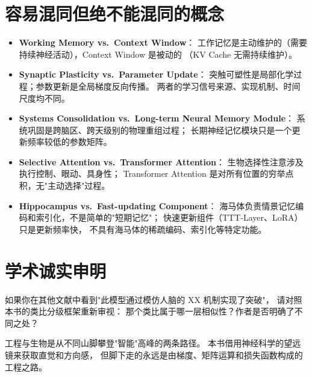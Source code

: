 \section{容易混同但绝不能混同的概念}

\begin{itemize}
  \item \textbf{Working Memory vs.\ Context Window}：
    工作记忆是主动维护的（需要持续神经活动），Context Window 是被动的
    （KV Cache 无需持续维护）。

  \item \textbf{Synaptic Plasticity vs.\ Parameter Update}：
    突触可塑性是局部化学过程；参数更新是全局梯度反向传播。
    两者的学习信号来源、实现机制、时间尺度均不同。

  \item \textbf{Systems Consolidation vs.\ Long-term Neural Memory Module}：
    系统巩固是跨脑区、跨天级别的物理重组过程；
    长期神经记忆模块只是一个更新频率较低的参数矩阵。

  \item \textbf{Selective Attention vs.\ Transformer Attention}：
    生物选择性注意涉及执行控制、眼动、具身性；
    Transformer Attention 是对所有位置的穷举点积，无"主动选择"过程。

  \item \textbf{Hippocampus vs.\ Fast-updating Component}：
    海马体负责情景记忆编码和索引化，不是简单的"短期记忆"；
    快速更新组件（TTT-Layer、LoRA）只是更新频率快，
    不具有海马体的稀疏编码、索引化等特定功能。
\end{itemize}

\section{学术诚实申明}

如果你在其他文献中看到"此模型通过模仿人脑的 XX 机制实现了突破"，
请对照本书的类比分级框架重新审视：
那个类比属于哪一层相似性？作者是否明确了不同之处？

工程与生物是从不同山脚攀登"智能"高峰的两条路径。
本书借用神经科学的望远镜来获取直觉和方向感，
但脚下走的永远是由梯度、矩阵运算和损失函数构成的工程之路。
